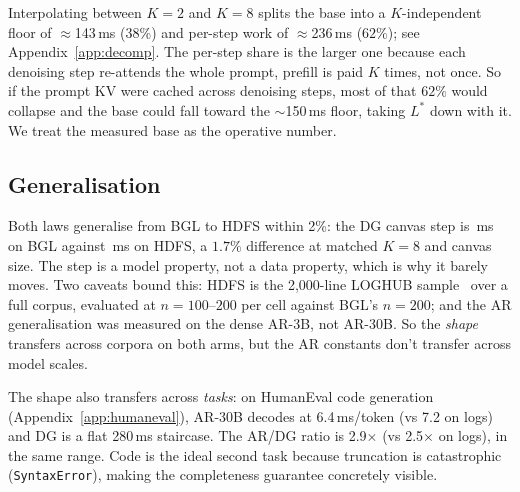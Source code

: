 Interpolating between $K{=}2$ and $K{=}8$ splits the base into a
$K$-independent floor of $\approx$143\,ms ($38\%$) and per-step work of
$\approx$236\,ms ($62\%$); see Appendix~\ref{app:decomp}. The per-step
share is the larger one because each denoising step re-attends the
whole prompt, prefill is paid $K$ times, not once. So if the prompt
KV were cached across denoising steps, most of that $62\%$ would
collapse and the base could fall toward the $\sim$150\,ms floor, taking
$L^{*}$ down with it. We treat the measured base as the operative
number.

\subsection{Generalisation}

Both laws generalise from BGL to HDFS within 2\%: the DG canvas step
is \bglStep\,ms on BGL against \hdfsStep\,ms on HDFS, a $1.7\%$
difference at matched $K{=}8$ and canvas size. The step is a model
property, not a data property, which is why it barely moves. Two
caveats bound this: HDFS is the 2{,}000-line LOGHUB
sample~\cite{loghub} over a full corpus, evaluated at
$n{=}100$--$200$ per cell against BGL's $n{=}200$; and the AR
generalisation was measured on the dense AR-3B, not AR-30B. So the
\emph{shape} transfers across corpora on both arms, but the AR
constants don't transfer across model scales.

The shape also transfers across \emph{tasks}: on HumanEval code
generation (Appendix~\ref{app:humaneval}), AR-30B decodes at
6.4\,ms/token (vs 7.2 on logs) and DG is a flat 280\,ms staircase. The
AR/DG ratio is 2.9$\times$ (vs 2.5$\times$ on logs), in the same range.
Code is the ideal second task because truncation is catastrophic
(\texttt{SyntaxError}), making the completeness guarantee concretely
visible.

